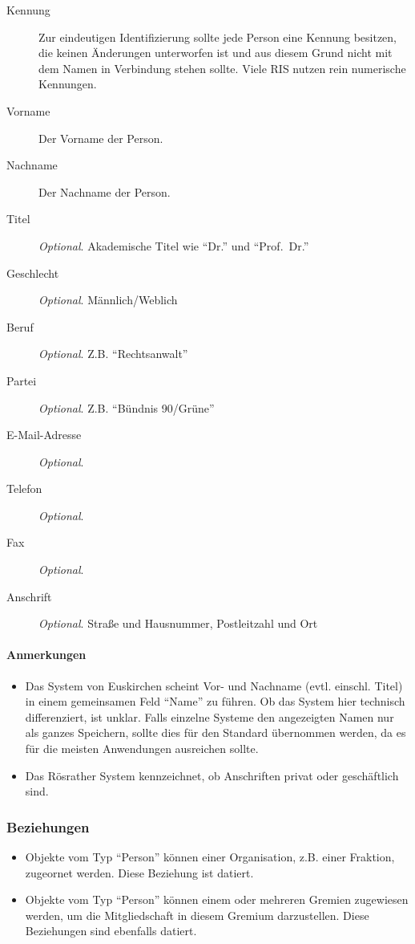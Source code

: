 \documentclass[,a4paper]{article}
\begin{document}
\begin{description}
\item[Kennung]
Zur eindeutigen Identifizierung sollte jede Person eine Kennung
besitzen, die keinen Änderungen unterworfen ist und aus diesem Grund
nicht mit dem Namen in Verbindung stehen sollte. Viele RIS nutzen rein
numerische Kennungen.
\item[Vorname]
Der Vorname der Person.
\item[Nachname]
Der Nachname der Person.
\item[Titel]
\emph{Optional}. Akademische Titel wie ``Dr.'' und ``Prof.~Dr.''
\item[Geschlecht]
\emph{Optional}. Männlich/Weblich
\item[Beruf]
\emph{Optional}. Z.B. ``Rechtsanwalt''
\item[Partei]
\emph{Optional}. Z.B. ``Bündnis 90/Grüne''
\item[E-Mail-Adresse]
\emph{Optional}.
\item[Telefon]
\emph{Optional}.
\item[Fax]
\emph{Optional}.
\item[Anschrift]
\emph{Optional}. Straße und Hausnummer, Postleitzahl und Ort
\end{description}

\paragraph{Anmerkungen}

\begin{itemize}
\item
  Das System von Euskirchen scheint Vor- und Nachname (evtl. einschl.
  Titel) in einem gemeinsamen Feld ``Name'' zu führen. Ob das System
  hier technisch differenziert, ist unklar. Falls einzelne Systeme den
  angezeigten Namen nur als ganzes Speichern, sollte dies für den
  Standard übernommen werden, da es für die meisten Anwendungen
  ausreichen sollte.
\item
  Das Rösrather System kennzeichnet, ob Anschriften privat oder
  geschäftlich sind.
\end{itemize}

\subsubsection{Beziehungen}

\begin{itemize}
\item
  Objekte vom Typ ``Person'' können einer Organisation, z.B. einer
  Fraktion, zugeornet werden. Diese Beziehung ist datiert.
\item
  Objekte vom Typ ``Person'' können einem oder mehreren Gremien
  zugewiesen werden, um die Mitgliedschaft in diesem Gremium
  darzustellen. Diese Beziehungen sind ebenfalls datiert.
\end{itemize}
\end{document}
